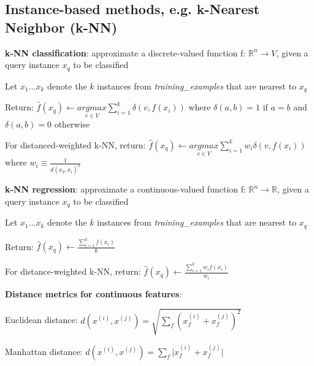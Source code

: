 \documentclass[letterpaper,fontsize=5pt]{scrartcl}
\renewenvironment{enumerate}[1]{\begin{compactenum}#1}{\end{compactenum}}
\theoremstyle{definition}
\newcommand{\abs}[1]{\lvert#1\rvert}
\begin{document}
\begin{multicols}{2}
\section{Instance-based methods, e.g. k-Nearest Neighbor (k-NN)}
	\begin{enumerate}
		\item \textbf{k-NN classification}: approximate a discrete-valued function f: $\mathbb{R}^{n} \rightarrow V$, given a query instance $x_q$ to be classified
			\begin{enumerate}
				\item Let $x_1 ... x_k$ denote the $k$ instances from \emph{training\_examples} that are nearest to $x_q$
				\item Return: $\hat{f}(x_q) \leftarrow \underset{v\in V}{argmax} \sum\limits_{i=1}^k \delta(v,f(x_i))$ where $\delta(a,b) = 1$ if $a=b$ and $\delta(a,b)=0$ otherwise
				\item For distanced-weighted k-NN, return: $\hat{f}(x_q) \leftarrow \underset{v\in V}{argmax} \sum\limits_{i=1}^k w_i \delta(v,f(x_i))$ \\ where $w_i \equiv \frac{1}{d(x_q,x_i)^2}$
			\end{enumerate}
		\item \textbf{k-NN regression}: approximate a continuous-valued function f: $\mathbb{R}^{n} \rightarrow \mathbb{R}$, given a query instance $x_q$ to be classified
			\begin{enumerate}
				\item Let $x_1 ... x_k$ denote the $k$ instances from \emph{training\_examples} that are nearest to $x_q$
				\item Return: $\hat{f}(x_q) \leftarrow \frac{\sum_{i=1}^{k} f(x_i)}{k}$
				\item For distance-weighted k-NN, return: $\hat{f}(x_q) \leftarrow \frac{\sum_{i=1}^{k} w_i f(x_i)}{w_i}$
			\end{enumerate}
		\item \textbf{Distance metrics for continuous features}:
			\begin{enumerate}
				\item Euclidean distance: $d(x^{(i)}, x^{(j)}) = \sqrt{\sum\limits_f (x_f^{(i)} + x_f^{(j)})^2}$
				\item Manhattan distance: $d(x^{(i)}, x^{(j)}) = \sum\limits_f \abs{x_f^{(i)} + x_f^{(j)}}$
			\end{enumerate}

\end{enumerate}
\end{multicols}
\end{document}
